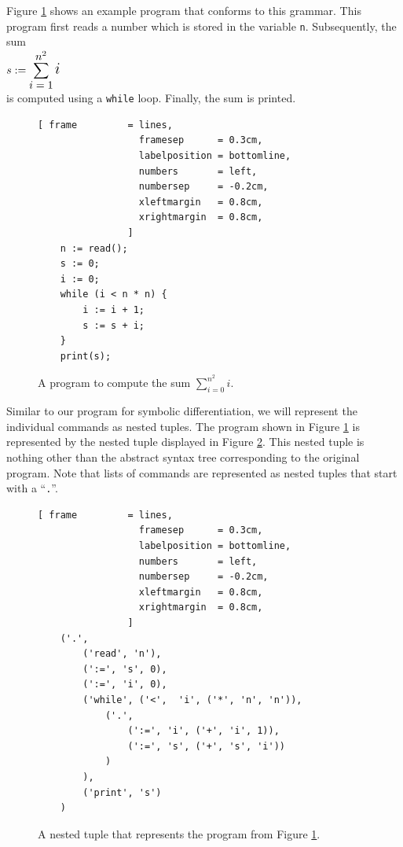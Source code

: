 Figure \ref{fig:sum.sl} shows
an example program that conforms to this grammar. This program first reads a number
which is stored in the variable \texttt{n}. Subsequently, the sum
\\[0.2cm]
\hspace*{1.3cm}
$\displaystyle s := \sum\limits_{\mbox{$\normalsize i=1$}}^{\mbox{$\normalsize n^2$}} \mbox{\Large $i$}$
\\[0.2cm]
is computed using a \texttt{while} loop.  Finally, the sum is printed.

\begin{figure}[!ht]
\centering
\begin{Verbatim}[ frame         = lines, 
                  framesep      = 0.3cm, 
                  labelposition = bottomline,
                  numbers       = left,
                  numbersep     = -0.2cm,
                  xleftmargin   = 0.8cm,
                  xrightmargin  = 0.8cm,
                ]
    n := read();
    s := 0;
    i := 0;
    while (i < n * n) {
        i := i + 1;
        s := s + i;
    }
    print(s);
\end{Verbatim}
\vspace*{-0.3cm}
\caption{A program to compute the sum $\sum\limits_{i=0}^{n^2} i$.}
\label{fig:sum.sl}
\end{figure}
\FloatBarrier

Similar to our program for symbolic differentiation, we will represent the individual commands as
nested tuples. The program shown in Figure \ref{fig:sum.sl} is represented by the nested tuple displayed in
Figure \ref{fig:sum.ast}. This nested tuple is nothing other than the abstract syntax tree
corresponding to the original program. Note that lists of commands are represented as nested tuples
that start with a ``\texttt{.}''.

\begin{figure}[!ht]
\centering
\begin{Verbatim}[ frame         = lines, 
                  framesep      = 0.3cm, 
                  labelposition = bottomline,
                  numbers       = left,
                  numbersep     = -0.2cm,
                  xleftmargin   = 0.8cm,
                  xrightmargin  = 0.8cm,
                ]
    ('.',            
        ('read', 'n'),
        (':=', 's', 0),
        (':=', 'i', 0),
        ('while', ('<',  'i', ('*', 'n', 'n')),
            ('.',
                (':=', 'i', ('+', 'i', 1)),
                (':=', 's', ('+', 's', 'i'))
            )    
        ),
        ('print', 's')
    )
\end{Verbatim}
\vspace*{-0.3cm}
\caption{A nested tuple that represents the program from Figure \ref{fig:sum.sl}.}
\label{fig:sum.ast}
\end{figure}

